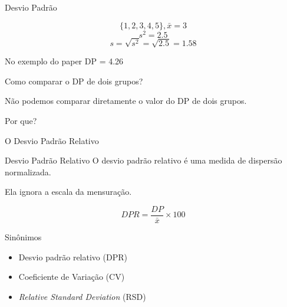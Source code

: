 \documentclass{beamer}
\begin{document}
\begin{frame}{\scriptsize Desvio Padrão}
  \begin{example}
      \begin{displaymath}
    \{1,2,3,4,5\}, \bar{x} = 3
  \end{displaymath}
      \begin{displaymath}
        s^2 = 2.5
      \end{displaymath}
    \begin{displaymath}
        s = \sqrt{s^2} = \sqrt{2.5} = 1.58
    \end{displaymath}
  \end{example}
  \begin{block}{No exemplo do paper}
    \footnotesize
    DP = 4.26
  \end{block}
\end{frame}

\begin{frame}{\scriptsize Como comparar o DP de dois grupos?}
  \begin{block}{}
    \footnotesize
    Não podemos comparar diretamente o \alert{valor} do DP de dois grupos.

    \bigskip
    Por que?
  \end{block}
\end{frame}

\begin{frame}{\scriptsize O Desvio Padrão Relativo}
  \begin{block}{Desvio Padrão Relativo}
    \footnotesize
    O desvio padrão relativo é uma medida de dispersão \alert{normalizada}.

    \bigskip
    Ela ignora a escala da mensuração.

    $$DPR = \frac{DP}{\bar{x}}\times 100$$
  \end{block}
  \begin{exampleblock}{Sinônimos}
    \footnotesize
    \begin{itemize}
    \footnotesize
    \item Desvio padrão relativo (DPR)
    \item Coeficiente de Variação (CV)
    \item {\em Relative Standard Deviation} (RSD)
  \end{itemize}
  \end{exampleblock}
\end{frame}
\end{document}
